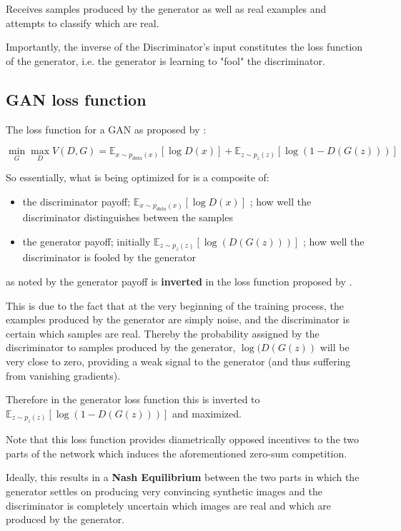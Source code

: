 Receives samples produced by the generator as well as real examples and attempts to classify which are real. 

Importantly, the inverse of the Discriminator's input constitutes the loss function of the generator, i.e. the generator is learning to "fool" the discriminator.

\pagebreak

\subsection{GAN loss function}

The loss function for a \ac{GAN} as proposed by \cite{goodfellow2014generative}:

$$\min_G \max_D V(D, G)=
\mathbb{E}_{x\sim p_{data}(x)}[\log D(x)]
+ \mathbb{E}_{z\sim p_z(z)}[\log(1 - D(G(z)))]$$

So essentially, what is being optimized for is a composite of:

\begin{itemize}
	\item the discriminator payoff; $\mathbb{E}_{x\sim p_{data}(x)}[\log D(x)]$ ; how well the discriminator distinguishes between the samples
	\item the generator payoff; initially $\mathbb{E}_{z\sim p_z(z)}[\log(D(G(z)))]$ ; how well the discriminator is fooled by the generator
\end{itemize}

as noted by \cite{raschka2017python} the generator payoff is \textbf{inverted} in the loss function proposed by \cite{goodfellow2014generative}. 

This is due to the fact that at the very beginning of the training process, the examples produced by the generator are simply noise, and the discriminator is certain which samples are real. Thereby the probability assigned by the discriminator to samples produced by the generator, $\log(D(G(z))$ will be very close to zero, providing a weak signal to the generator (and thus suffering from vanishing gradients). 

Therefore in the generator loss function this is inverted to $\mathbb{E}_{z\sim p_z(z)}[\log(1 - D(G(z)))]$ and maximized.

\pagebreak

Note that this loss function provides diametrically opposed incentives to the two parts of the network which induces the aforementioned zero-sum competition. 

Ideally, this results in a \textbf{Nash Equilibrium} between the two parts in which the generator settles on producing very convincing synthetic images and the discriminator is completely uncertain which images are real and which are produced by the generator.

